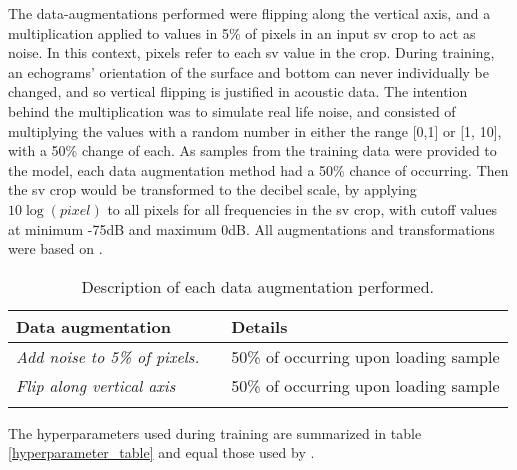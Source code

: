         The data-augmentations performed were flipping along the vertical axis, and a multiplication applied to values in 5\% of pixels in an input \gls{sv} crop to act as noise.  In this context, pixels refer to each \gls{sv} value in the crop. During training, an echograms' orientation of the surface and bottom can never individually be changed, and so vertical flipping is justified in acoustic data. The intention behind the multiplication was to simulate real life noise, and consisted of multiplying the values with a random number in either the range [0,1] or [1, 10], with a 50\% change of each.  As samples from the training data were provided to the model, each data augmentation method had a 50\% chance of occurring. Then the \gls{sv} crop would be transformed to the decibel scale, by applying $10\log{(pixel)}$ to all pixels for all frequencies in the \gls{sv} crop, with cutoff values at minimum -75dB and maximum 0dB. All augmentations and transformations were based on \citeauthor{brautaset2020acoustic}\cite{brautaset2020acoustic}. 
        
        
        
        \begin{longtable}{lll}

            \caption[Data augmentation summary]{Description of each data augmentation performed.}
            \\\hline
            \multicolumn{2}{|l|}{\textbf{Data augmentation}} & \multicolumn{1}{l|}{\textbf{Details}} \\ \hline
            \endfirsthead
            \endhead
            \textit{Add noise to 5\% of pixels.}      &       & 50\% of occurring upon loading sample \\ \hline
            \textit{Flip along vertical axis}        &       & 50\% of occurring upon loading sample \\ \hline

            \label{data_augmentation_table}
        \end{longtable}
        
        The hyperparameters used during training are summarized in table \ref{hyperparameter_table} and equal those used by \citeauthor{brautaset2020acoustic}\cite{brautaset2020acoustic}.

